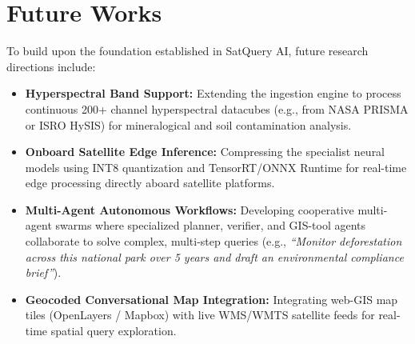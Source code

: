 \documentclass[12pt,a4paper]{report}
\begin{document}
\section{Future Works}
To build upon the foundation established in SatQuery AI, future research directions include:
\begin{itemize}
    \item \textbf{Hyperspectral Band Support:} Extending the ingestion engine to process continuous 200+ channel hyperspectral datacubes (e.g., from NASA PRISMA or ISRO HySIS) for mineralogical and soil contamination analysis.
    \item \textbf{Onboard Satellite Edge Inference:} Compressing the specialist neural models using INT8 quantization and TensorRT/ONNX Runtime for real-time edge processing directly aboard satellite platforms.
    \item \textbf{Multi-Agent Autonomous Workflows:} Developing cooperative multi-agent swarms where specialized planner, verifier, and GIS-tool agents collaborate to solve complex, multi-step queries (e.g., \textit{``Monitor deforestation across this national park over 5 years and draft an environmental compliance brief''}).
    \item \textbf{Geocoded Conversational Map Integration:} Integrating web-GIS map tiles (OpenLayers / Mapbox) with live WMS/WMTS satellite feeds for real-time spatial query exploration.
\end{itemize}
\end{document}

